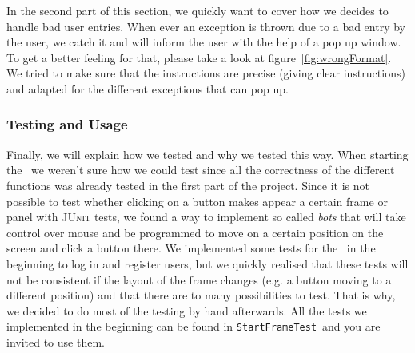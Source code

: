 In the second part of this section, we quickly want to cover how we decides to handle bad user 
entries. When ever an exception is thrown due to a bad entry by the user, we catch it and will inform 
the user with the help of a pop up window. To get a better feeling for that, please take a look at 
figure~\ref{fig:wrongFormat}. We tried to make sure that the instructions are precise (giving clear 
instructions) and adapted for the different exceptions that can pop up.

\subsubsection{Testing and Usage} %
\label{ssub:testing_and_usage}

Finally, we will explain how we tested and why we tested this way. 
When starting the \GUI~we weren't sure how we could test since all the correctness of the different 
functions was already tested in the first part of the project. Since it is not possible to test 
whether clicking on a button makes appear a certain frame or panel with \textsc{JUnit} tests, we 
found a way to implement so called \emph{bots} that will take control over mouse and be programmed to 
move on a certain position on the screen and click a button there. We implemented some tests for the 
\StFra~in the beginning to log in and register users, but we quickly realised that these tests will 
not be consistent if the layout of the frame changes (e.g. a button moving to a different position) 
and that there are to many possibilities to test. That is why, we decided to do most of the testing 
by hand afterwards. All the tests we implemented in the beginning can be found in 
\lstinline|StartFrameTest|~and you are invited to use them.



